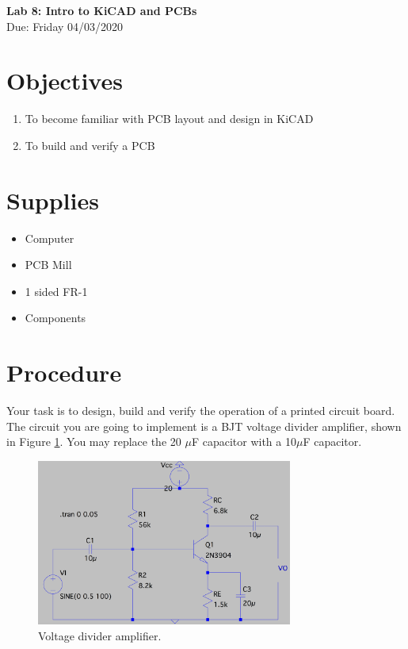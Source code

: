 \documentclass[12pt,letterpaper,onecolumn]{report}
\begin{document}
\begin{center}
\LARGE{\textbf{Lab 8: Intro to KiCAD and PCBs}}\\
\Large{Due: Friday 04/03/2020}
\\

\end{center}

\section*{Objectives}
\begin{enumerate}
\item To become familiar with PCB layout and design in KiCAD
\item To build and verify a PCB

\end{enumerate}

\section*{Supplies}
\begin{itemize}
\item Computer
\item PCB Mill
\item 1 sided FR-1
\item Components
\end{itemize}

\section*{Procedure}
Your task is to design, build and verify the operation of a printed circuit board.  The circuit you are going to implement is a BJT voltage divider amplifier, shown in Figure \ref{Fig1}.  You may replace the 20 $\mu$F capacitor with a 10$\mu$F capacitor.\\

\begin{figure}[ht]
\begin{center}
\includegraphics[width=0.75\textwidth]{Figures/VD_BJT_amp.png}
\caption{Voltage divider amplifier.}
\label{Fig1}
\end{center}
\end{figure}
\end{document}
